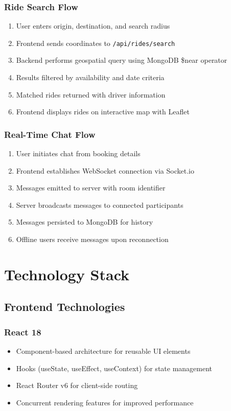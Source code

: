 \documentclass[12pt,a4paper]{article}
\begin{document}
\subsubsection{Ride Search Flow}
\begin{enumerate}
    \item User enters origin, destination, and search radius
    \item Frontend sends coordinates to \texttt{/api/rides/search}
    \item Backend performs geospatial query using MongoDB \$near operator
    \item Results filtered by availability and date criteria
    \item Matched rides returned with driver information
    \item Frontend displays rides on interactive map with Leaflet
\end{enumerate}

\subsubsection{Real-Time Chat Flow}
\begin{enumerate}
    \item User initiates chat from booking details
    \item Frontend establishes WebSocket connection via Socket.io
    \item Messages emitted to server with room identifier
    \item Server broadcasts messages to connected participants
    \item Messages persisted to MongoDB for history
    \item Offline users receive messages upon reconnection
\end{enumerate}

\newpage

\section{Technology Stack}

\subsection{Frontend Technologies}

\subsubsection{React 18}
\begin{itemize}
    \item Component-based architecture for reusable UI elements
    \item Hooks (useState, useEffect, useContext) for state management
    \item React Router v6 for client-side routing
    \item Concurrent rendering features for improved performance
\end{itemize}
\end{document}
